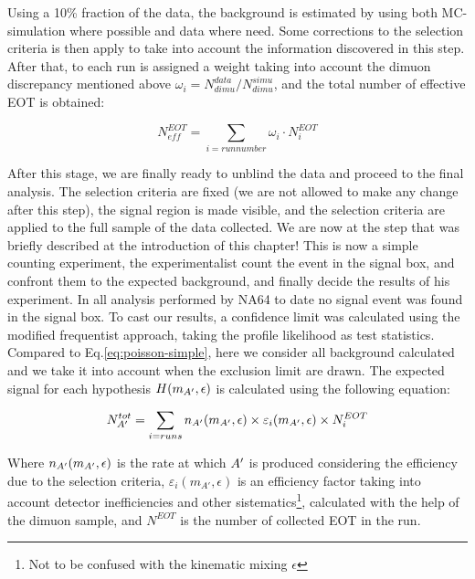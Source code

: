 Using a 10\% fraction of the data, the background is estimated by using both MC-simulation where possible and data where need. Some corrections to the selection criteria is then apply to take into account the information discovered in this step. After that, to each run is assigned a weight taking into account the dimuon discrepancy mentioned above $\omega_i = N^{data}_{dimu}/N^{simu}_{dimu}$, and the total number of effective EOT is obtained:

\begin{equation}
  \label{eq:effective-eots}
  N_{eff}^{EOT} = \sum_{i=run number} \omega_i \cdot N^{EOT}_i
\end{equation}

After this stage, we are finally ready to unblind the data and proceed to the final analysis. The selection criteria are fixed (we are not allowed to make any change after this step), the signal region is made visible, and the selection criteria are applied to the full sample of the data collected. We are now at the step that was briefly described at the introduction of this chapter! This is now a simple counting experiment, the experimentalist count the event in the signal box, and confront them to the expected background, and finally decide the results of his experiment. In all analysis performed by NA64 to date \cite{Banerjee:2020fue,Banerjee:2019hmi,NA64:2019imj,na64-prd,Banerjee:2018vgk,Banerjee:2016tad} no signal event was found in the signal box. To cast our results, a confidence limit was calculated using the modified frequentist approach, taking the profile likelihood as test statistics\cite{JUNK1999435,Read_2002,Cowan:2010js}. Compared to Eq.\ref{eq:poisson-simple}, here we consider all background calculated and we take it into account when the exclusion limit are drawn. The expected signal for each hypothesis $H(m_{A'},\epsilon)$ is calculated using the following equation:

\begin{equation}
  \label{eq:dm-expected-signal}
  N^{tot}_{A'} = \sum_{i=runs} n_{A'}(m_{A'},\epsilon) \times \varepsilon_i(m_{A'},\epsilon) \times N^{EOT}_i
\end{equation}

Where $n_{A'}(m_{A'},\epsilon)$ is the rate at which $A'$ is produced considering the efficiency due to the selection criteria, $\varepsilon_i(m_{A'},\epsilon)$ is an efficiency factor taking into account detector inefficiencies and other sistematics\footnote{Not to be confused with the kinematic mixing $\epsilon$}, calculated with the help of the dimuon sample, and $N^{EOT}$ is the number of collected EOT in the run.

